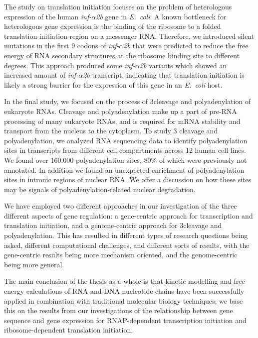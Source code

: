The study on translation initiation focuses on the problem of heterologous
expression of the human \textit{inf-$\alpha$2b} gene in \textit{E.\ coli}. A
known bottleneck for heterologous gene expression is the binding of the
ribosome to a folded translation initiation region on a messenger RNA.
Therefore, we introduced silent mutations in the first 9 codons of
\textit{inf-$\alpha$2b} that were predicted to reduce the free energy of RNA
secondary structures at the ribosome binding site to different degrees. This
approach produced some \textit{inf-$\alpha$2b} variants which showed an 
increased amount of \textit{inf-$\alpha$2b} transcript, indicating that
translation initiation is likely a strong barrier for the expression of this
gene in an \textit{E.\ coli} host.

In the final study, we focused on the process of 3\ppp cleavage and
polyadenylation of eukaryote RNAs. Cleavage and polyadenylation make up a part
of pre-RNA processing of many eukaryote RNAs, and is required for mRNA
stability and transport from the nucleus to the cytoplasm. To study 3\ppp
cleavage and polyadenylation, we analyzed RNA sequencing data to identify
polyadenylation sites in transcripts from different cell compartments across
12 human cell lines. We found over 160.000 polyadenylation sites, 80\% of
which were previously not annotated. In addition we found an unexpected
enrichment of polyadenylation sites in intronic regions of nuclear RNA. We
offer a discussion on how these sites may be signals of
polyadenylation-related nuclear degradation.

We have employed two different approaches in our investigation of the three
different aspects of gene regulation: a gene-centric approach for transcription
and translation initiation, and a genome-centric approach for 3\ppp cleavage
and polyadenylation. This has resulted in different types of research questions
being asked, different computational challenges, and different sorts of
results, with the gene-centric results being more mechanism oriented, and the
genome-centric being more general.

The main conclusion of the thesis as a whole is that kinetic modelling and
free energy calculations of RNA and DNA nucleotide chains have been
successfully applied in combination with traditional molecular biology
techniques; we base this on the results from our investigations of the
relationship between gene sequence and gene expression for RNAP-dependent
transcription initiation and ribosome-dependent translation initiation.
